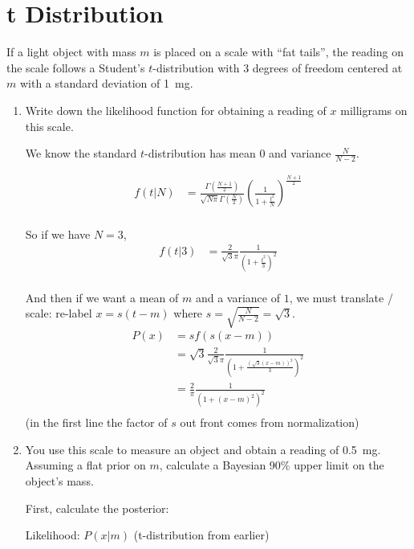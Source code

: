 \section{t Distribution}

If a light object with mass $m$ is placed on a scale with ``fat tails'', the reading on the scale follows a Student's $t$-distribution with 3 degrees of freedom centered at $m$ with a standard deviation of \SI{1}{mg}.

\begin{enumerate}[label=\textbf{\Alph*}.]
    \item Write down the likelihood function for obtaining a reading of $x$ milligrams on this scale.

    We know the standard $t$-distribution has mean 0 and variance $\frac{N}{N-2}$.

    \begin{align*}
        f(t|N) &= \frac{\Gamma\left(\frac{N+1}{2}\right)}{\sqrt{N\pi}\Gamma\left(\frac{N}{2}\right)}\left(\frac{1}{1 + \frac{t^2}{N}}\right)^{\frac{N+1}{2}} \\
    \end{align*}

    So if we have $N=3$,
    \begin{align*}
        f(t|3) &= \frac{2}{\sqrt{3}\pi}\frac{1}{\left(1 + \frac{t^2}{3}\right)^{2}} \\
    \end{align*}

    And then if we want a mean of $m$ and a variance of $1$, we must translate / scale: re-label $x = s(t-m)$ where $s = \sqrt{\frac{N}{N-2}} = \sqrt{3}$.
    \begin{align*}
        P(x) &= sf(s(x-m)) \\
        &= \sqrt{3}\frac{2}{\sqrt{3}\pi}\frac{1}{\left(1 + \frac{(\sqrt{3}(x-m))^2}{3}\right)^{2}} \\
        &= \frac{2}{\pi}\frac{1}{\left(1 + (x-m)^2\right)^{2}} \\
    \end{align*}
    (in the first line the factor of $s$ out front comes from normalization)

    \item You use this scale to measure an object and obtain a reading of \SI{0.5}{mg}. Assuming a flat prior on $m$, calculate a Bayesian 90\% upper limit on the object's mass.

    First, calculate the posterior:

    Likelihood: $P(x|m)$ (t-distribution from earlier)


\end{enumerate}
